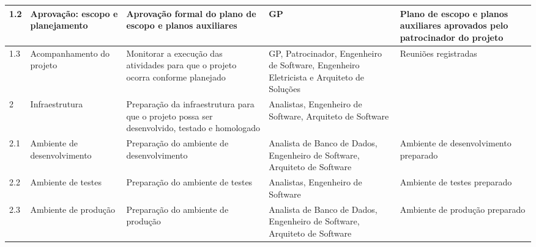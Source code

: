\begin{landscape}
\begin{longtable}{@{\extracolsep{\fill}}  l  p{}  p{}  p{}  p{}  }
	\midrule
	1.2         & Aprovação: escopo e planejamento                        & Aprovação formal do plano de escopo e planos auxiliares                                                                                                                        & GP                                                                                               & Plano de escopo e planos auxiliares aprovados pelo patrocinador do projeto                               \\*
	\midrule
	1.3         & Acompanhamento do projeto                                 & Monitorar a execução das atividades para que o projeto ocorra conforme planejado                                                                                               & GP, Patrocinador, Engenheiro de Software, Engenheiro Eletricista e Arquiteto de Soluções       & Reuniões registradas                                                                                    \\*
	\midrule
	2           & Infraestrutura                                            & Preparação da infraestrutura para que o projeto possa ser desenvolvido, testado e homologado                                                                                   & Analistas, Engenheiro de Software, Arquiteto de Software                                         &                                                                                                          \\*
	\midrule
	2.1         & Ambiente de desenvolvimento                               & Preparação do ambiente de desenvolvimento                                                                                                                                      & Analista de Banco de Dados, Engenheiro de Software, Arquiteto de Software                        & Ambiente de desenvolvimento preparado                                                                    \\*
	\midrule
	2.2         & Ambiente de testes                                        & Preparação do ambiente de testes                                                                                                                                               & Analistas, Engenheiro de Software                                                                & Ambiente de testes preparado                                                                             \\*
	\midrule
	2.3         & Ambiente de produção                                    & Preparação do ambiente de produção                                                                                                                                           & Analista de Banco de Dados, Engenheiro de Software, Arquiteto de Software                        & Ambiente de produção preparado                                                                         \\*

\end{longtable}
\end{landscape}
